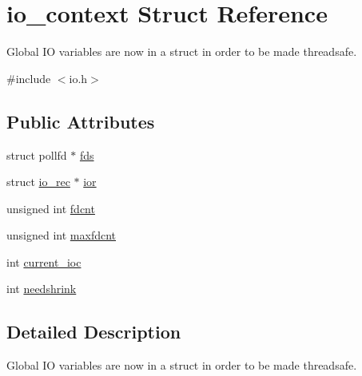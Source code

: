 \hypertarget{structio__context}{
\section{io\_\-context Struct Reference}
\label{structio__context}
}


Global IO variables are now in a struct in order to be made threadsafe.  




{\ttfamily \#include $<$io.h$>$}

\subsection*{Public Attributes}
\begin{DoxyCompactItemize}
\item 
struct pollfd $\ast$ \hyperlink{structio__context_aa63a2d3e2dc319d7abf5135fbcc69678}{fds}
\item 
struct \hyperlink{structio__rec}{io\_\-rec} $\ast$ \hyperlink{structio__context_a9738fcd9c2a5ab1eda8f386c5e4e3503}{ior}
\item 
unsigned int \hyperlink{structio__context_ad784e26b7cd7e03761d0846362748ef4}{fdcnt}
\item 
unsigned int \hyperlink{structio__context_af59f406dc073350e6babc8eddd4e0872}{maxfdcnt}
\item 
int \hyperlink{structio__context_ac9a730f2bc91e9c3e76bf1f39a486dde}{current\_\-ioc}
\item 
int \hyperlink{structio__context_ae910ea202fa1769e63e4680b70888b3a}{needshrink}
\end{DoxyCompactItemize}


\subsection{Detailed Description}
Global IO variables are now in a struct in order to be made threadsafe. 


